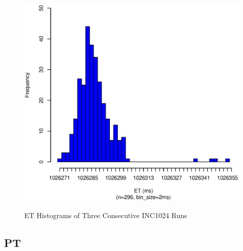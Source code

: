 \begin{figure}[hp!]
{		\includegraphics[scale=0.28]{1024_run/1024_sec_et_hist3.eps}
		\label{fig:inc1024_run3_et}
	}
	\caption{ET Histograms of Three Consecutive INC1024 Runs\label{fig:s9_inc1024_et}}
\end{figure}

\subsection{PT}

